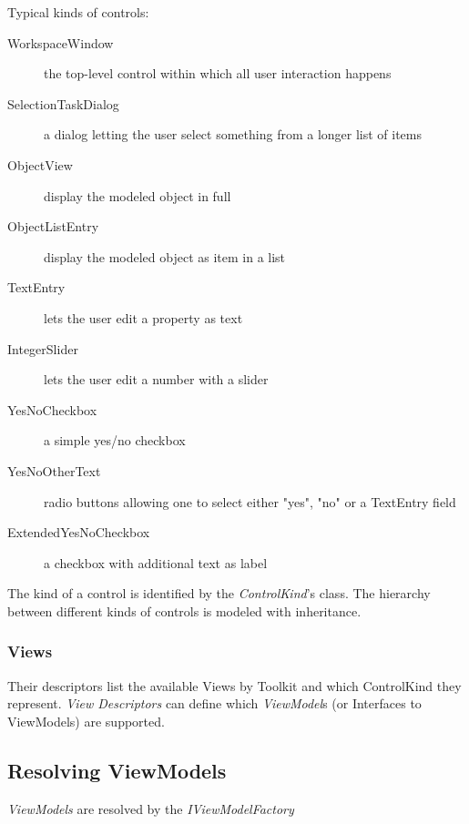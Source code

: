 Typical kinds of controls:

\begin{description}

\item[WorkspaceWindow] {the top-level control within which all user
interaction happens}

\item[SelectionTaskDialog] {a dialog letting the user select something
from a longer list of items}

\item[ObjectView] {display the modeled object in full}

\item[ObjectListEntry] {display the modeled object as item in a list}

\item[TextEntry] {lets the user edit a property as text}

\item[IntegerSlider] {lets the user edit a number with a slider}

\item[YesNoCheckbox] {a simple yes/no checkbox}

\item[YesNoOtherText] {radio buttons allowing one to select either "yes",
"no" or a TextEntry field}

\item[ExtendedYesNoCheckbox] {a checkbox with additional text as label}

\end{description}

The kind of a control is identified by the \emph{ControlKind}'s class. The
hierarchy between different kinds of controls is modeled with inheritance.

\subsubsection{Views}

Their descriptors list the available Views by Toolkit and which ControlKind they represent. \emph{View Descriptors} can define which \emph{ViewModel}s (or Interfaces to ViewModels) are supported.

\subsection{Resolving ViewModels}

\emph{ViewModels} are resolved by the \emph{IViewModelFactory}

